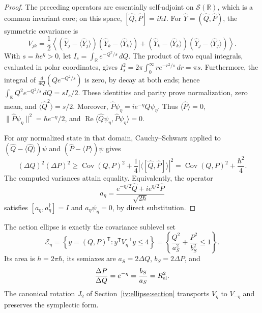 \begin{proof}
The preceding operators are essentially self-adjoint on
\(\mathcal S(\mathbb R)\), which is a common invariant core;
on this space,
\([\widehat Q,\widehat P]=i\hbar I\). For
\(\widehat Y=(\widehat Q,\widehat P)\), the symmetric covariance is
\[
 V_{jk}=\frac12\left\langle
 (\widehat Y_j-\langle\widehat Y_j\rangle)
 (\widehat Y_k-\langle\widehat Y_k\rangle)
 +(\widehat Y_k-\langle\widehat Y_k\rangle)
 (\widehat Y_j-\langle\widehat Y_j\rangle)
 \right\rangle.
\]
With \(s=\hbar e^\eta>0\), let
\(I_s=\int_{\mathbb R}e^{-Q^2/s}\,dQ\). The product of two
equal integrals, evaluated in polar coordinates, gives
\(I_s^2=2\pi\int_0^\infty r e^{-r^2/s}\,dr=\pi s\).
Furthermore, the integral of
\(\frac{d}{dQ}(Qe^{-Q^2/s})\) is zero, by decay at both
ends; hence
\(\int_{\mathbb R}Q^2e^{-Q^2/s}\,dQ=sI_s/2\).
These identities and parity prove normalization, zero mean, and
\(\langle\widehat Q^2\rangle=s/2\). Moreover,
\(\widehat P\psi_\eta=i e^{-\eta}Q\psi_\eta\).
Thus \(\langle\widehat P\rangle=0\),
\(\|\widehat P\psi_\eta\|^2=\hbar e^{-\eta}/2\), and
\(\operatorname{Re}\langle\widehat Q\psi_\eta,
\widehat P\psi_\eta\rangle=0\).

For any normalized state in that domain, Cauchy--Schwarz applied
to \((\widehat Q-\langle\widehat Q\rangle)\psi\) and
\((\widehat P-\langle\widehat P\rangle)\psi\) gives
\[
 (\Delta Q)^2(\Delta P)^2
 \geq \operatorname{Cov}(Q,P)^2
       +\frac14\left|\langle[\widehat Q,\widehat P]\rangle\right|^2
 =\operatorname{Cov}(Q,P)^2+\frac{\hbar^2}{4}.
\]
The computed variances attain equality. Equivalently, the
operator
\[
 a_\eta=\frac{e^{-\eta/2}\widehat Q
                  +i e^{\eta/2}\widehat P}{\sqrt{2\hbar}}
\]
satisfies \([a_\eta,a_\eta^\dagger]=I\) and
\(a_\eta\psi_\eta=0\), by direct substitution.
\end{proof}

\begin{proposition}
\label{prop:ii-area-covarianza-reciprocidad}
The action ellipse is exactly the covariance sublevel set
\begin{equation}
 \mathcal E_\eta
 =\left\{y=(Q,P)^{\mathsf T}:y^{\mathsf T}V_\eta^{-1}y\leq4\right\}
 =\left\{\frac{Q^2}{a_S^2}+\frac{P^2}{b_S^2}\leq1\right\}.
 \label{eq:ii-elipse-covarianza}
\end{equation}
Its area is \(h=2\pi\hbar\), its semiaxes are
\(a_S=2\Delta Q\), \(b_S=2\Delta P\), and
\begin{equation}
 \frac{\Delta P}{\Delta Q}=e^{-\eta}
 =\frac{b_S}{a_S}=R_{\rm el}^2.
 \label{eq:ii-covarianza-forma}
\end{equation}
The canonical rotation \(J_2\) of Section~\ref{iv:ellipse:section} transports
\(V_\eta\) to \(V_{-\eta}\) and preserves the symplectic form.
\end{proposition}

